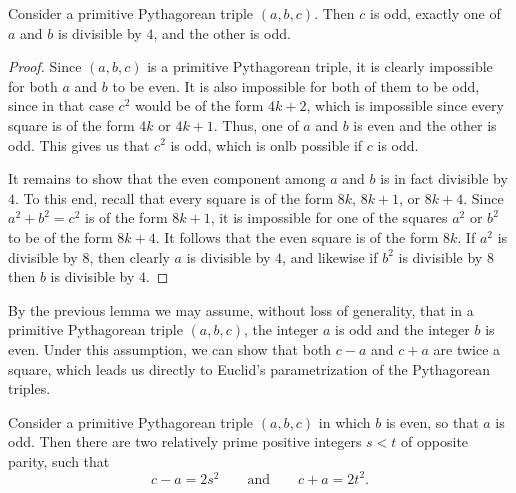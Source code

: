 \begin{lemma}\label{lemma:div-4-pythagorean-triple}
  Consider a primitive Pythagorean triple $(a,b,c)$. Then $c$ is odd, exactly one of $a$ and $b$ is divisible by $4$, and the other is odd.
\end{lemma}

\begin{proof}
  Since $(a,b,c)$ is a primitive Pythagorean triple, it is clearly impossible for both $a$ and $b$ to be even. It is also impossible for both of them to be odd, since in that case $c^2$ would be of the form $4k+2$, which is impossible since every square is of the form $4k$ or $4k+1$. Thus, one of $a$ and $b$ is even and the other is odd. This gives us that $c^2$ is odd, which is onlb possible if $c$ is odd.

  It remains to show that the even component among $a$ and $b$ is in fact divisible by $4$. To this end, recall that every square is of the form $8k$, $8k+1$, or $8k+4$. Since $a^2+b^2=c^2$ is of the form $8k+1$, it is impossible for one of the squares $a^2$ or $b^2$ to be of the form $8k+4$. It follows that the even square is of the form $8k$. If $a^2$ is divisible by $8$, then clearly $a$ is divisible by $4$, and likewise if $b^2$ is divisible by $8$ then $b$ is divisible by $4$.
\end{proof}

By the previous lemma we may assume, without loss of generality, that in a primitive Pythagorean triple $(a,b,c)$, the integer $a$ is odd and the integer $b$ is even. Under this assumption, we can show that both $c-a$ and $c+a$ are twice a square, which leads us directly to Euclid's parametrization of the Pythagorean triples.

\begin{lemma}\label{lemma:euclids-parametrization}
  Consider a primitive Pythagorean triple $(a,b,c)$ in which $b$ is even, so that $a$ is odd. Then there are two relatively prime positive integers $s<t$ of opposite parity, such that
  \begin{equation*}
    c-a=2s^2 \qquad\text{and}\qquad c+a=2t^2.
  \end{equation*}
\end{lemma}

